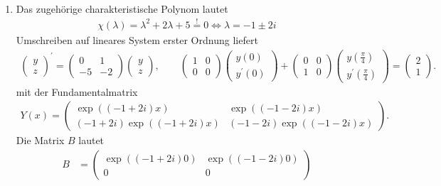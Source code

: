 \begin{solution}
\begin{enumerate}[label = \textbf{\alph*)}]
  \item Das zugehörige charakteristische Polynom lautet
  \begin{align*}
    \chi(\lambda) = \lambda^2 + 2\lambda + 5 \stackrel{!}{=} 0
    \iff \lambda = -1 \pm 2i
  \end{align*}
  Umschreiben auf lineares System erster Ordnung liefert
  \begin{align*}
    \begin{pmatrix}
      y \\ z
    \end{pmatrix}^{\prime}
    = \begin{pmatrix}
      0 & 1 \\
      -5 & -2
    \end{pmatrix}
    \begin{pmatrix}
      y \\ z
    \end{pmatrix}, \qquad
    \begin{pmatrix}
      1 & 0 \\ 0 & 0
    \end{pmatrix}
    \begin{pmatrix}
      y(0) \\ y^{\prime}(0)
    \end{pmatrix}
    +
    \begin{pmatrix}
      0 & 0 \\ 1 & 0
    \end{pmatrix}
    \begin{pmatrix}
      y(\frac{\pi}{4}) \\ y^{\prime}(\frac{\pi}{4})
    \end{pmatrix}
    =
    \begin{pmatrix}
      2 \\ 1
    \end{pmatrix}.
  \end{align*}
  mit der Fundamentalmatrix
  \begin{align*}
    Y(x) = \begin{pmatrix}
      \exp((-1+2i)x) & \exp((-1-2i)x) \\
      (-1+2i)\exp((-1+2i)x) & (-1-2i)\exp((-1-2i)x)
    \end{pmatrix}.
  \end{align*}
  Die Matrix $B$ lautet
  \begin{align*}
    B &= \begin{pmatrix}
      \exp((-1 + 2i)0) & \exp((-1 - 2i)0) \\ 0 & 0
    \end{pmatrix}

\end{align*}
\end{enumerate}
\end{solution}
